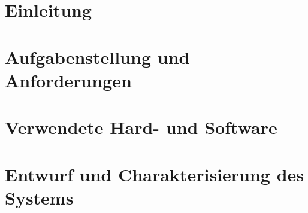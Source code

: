 \documentclass[12pt,a4paper,oneside]{report}
\begin{document}
\listoffigures
{}
\newpage


\cleardoublepage
{}

\chapter{Einleitung}

\bigskip

\chapter{Aufgabenstellung und Anforderungen}\label{Kap:Aufgabe}

\bigskip

\chapter{Verwendete Hard- und Software}\label{Kap:Material}

\bigskip

\chapter{Entwurf und Charakterisierung des Systems}\label{Kap:System}

\bigskip
\end{document}

